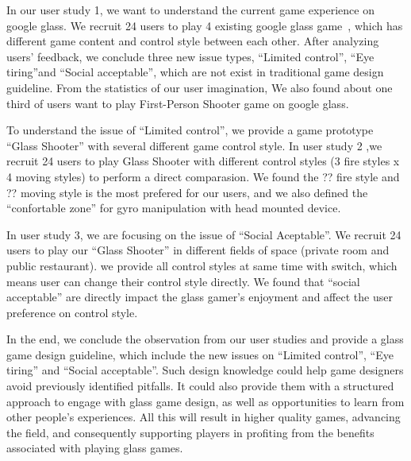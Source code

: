 In our user study 1, we want to understand the current game experience on google glass. We recruit 24 users to play 4 existing google glass game~\cite{minigame}, which has different game content and control style between each other. After analyzing users' feedback, we conclude three new issue types, ``Limited control'', ``Eye tiring''and ``Social acceptable'', which are not exist in traditional game design guideline. From the statistics of our user imagination, We also found about one third of users want to play First-Person Shooter game on google glass.

To understand the issue of ``Limited control'', we provide a game prototype ``Glass Shooter'' with several different game control style. In user study 2 ,we recruit 24 users to play Glass Shooter with different control styles (3 fire styles x 4 moving styles) to perform a direct comparasion. We found the ?? fire style and ?? moving style is the most prefered for our users, and we also defined the ``confortable zone'' for gyro manipulation with head mounted device.

In user study 3, we are focusing on the issue of ``Social Aceptable''. We recruit 24 users to play our ``Glass Shooter'' in different fields of space (private room and public restaurant). we provide all control styles at same time with switch, which means user can change their control style directly. We found that ``social acceptable'' are directly impact the glass gamer's enjoyment and affect the user preference on control style.

In the end, we conclude the observation from our user studies and provide a glass game design guideline, which include the new issues on ``Limited control'', ``Eye tiring'' and ``Social acceptable''. Such design knowledge could help game designers avoid previously identified pitfalls. It could also provide them with a structured approach to engage with glass game design, as well as opportunities to learn from other people’s experiences. All this will result in higher quality games, advancing the field, and consequently supporting players in profiting from the benefits associated with playing glass games.


